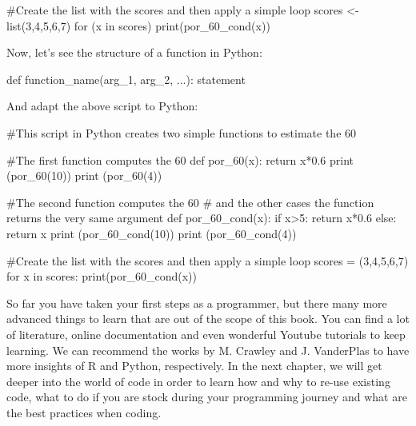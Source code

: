 \begin{exampler}
#Create the list with the scores and then apply a simple loop
scores <- list(3,4,5,6,7)
for (x in scores)
{
  print(por_60_cond(x))
}
\end{exampler}

Now, let’s see the structure of a function in Python:

\begin{examplepy}
def function_name(arg_1, arg_2, ...):
  statement
\end{examplepy}

And adapt the above script to Python:

\begin{examplepy}
#This script in Python creates two simple functions to estimate the 60%

#The first function computes the 60%
def por_60(x):
  return x*0.6
print (por_60(10))
print (por_60(4))

#The second function computes the 60%
# and the other cases the function returns the very same argument
def por_60_cond(x):
  if x>5:
    return x*0.6
  else:
    return x
print (por_60_cond(10))
print (por_60_cond(4))

#Create the list with the scores and then apply a simple loop
scores = (3,4,5,6,7)
for x in scores:
  print(por_60_cond(x))
\end{examplepy}

So far you have taken your first steps as a programmer, but there many more advanced things to learn that are out of the scope of this book. You can find a lot of literature, online documentation and even wonderful Youtube tutorials to keep learning. We can recommend the works by M. Crawley\cite{crawley2012r}  and J. VanderPlas\cite{vanderplas2016python}  to have more insights of R and Python, respectively. In the next chapter, we will get deeper into the world of code in order to learn how and why to re-use existing code, what to do if you are stock during your programming journey and what are the best practices when coding.